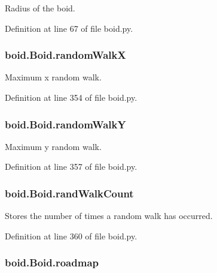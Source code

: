 Radius of the boid. 



Definition at line 67 of file boid.\-py.

\hypertarget{classboid_1_1Boid_a996d92e215eb56d98a811c86c7118637}{
\subsubsection[{random\-Walk\-X}]{\setlength{\rightskip}{0pt plus 5cm}boid.\-Boid.\-random\-Walk\-X}}\label{classboid_1_1Boid_a996d92e215eb56d98a811c86c7118637}


Maximum x random walk. 



Definition at line 354 of file boid.\-py.

\hypertarget{classboid_1_1Boid_a1bf0149b7eadf9e6a0f08c93d95bac73}{
\subsubsection[{random\-Walk\-Y}]{\setlength{\rightskip}{0pt plus 5cm}boid.\-Boid.\-random\-Walk\-Y}}\label{classboid_1_1Boid_a1bf0149b7eadf9e6a0f08c93d95bac73}


Maximum y random walk. 



Definition at line 357 of file boid.\-py.

\hypertarget{classboid_1_1Boid_af0bd96c51b17bc6c3f6fec2891b58a3d}{
\subsubsection[{rand\-Walk\-Count}]{\setlength{\rightskip}{0pt plus 5cm}boid.\-Boid.\-rand\-Walk\-Count}}\label{classboid_1_1Boid_af0bd96c51b17bc6c3f6fec2891b58a3d}


Stores the number of times a random walk has occurred. 



Definition at line 360 of file boid.\-py.

\hypertarget{classboid_1_1Boid_aa30539a3bd11871eda471245cd6318e2}{
\subsubsection[{roadmap}]{\setlength{\rightskip}{0pt plus 5cm}boid.\-Boid.\-roadmap}}\label{classboid_1_1Boid_aa30539a3bd11871eda471245cd6318e2}



